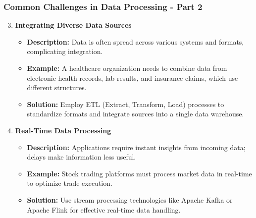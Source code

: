 \documentclass[aspectratio=169]{beamer}
\begin{document}
\begin{frame}[fragile]
    \frametitle{Common Challenges in Data Processing - Part 2}
    \begin{enumerate}
        \setcounter{enumi}{2}
        \item \textbf{Integrating Diverse Data Sources}
        \begin{itemize}
            \item \textbf{Description:} Data is often spread across various systems and formats, complicating integration.
            \item \textbf{Example:} A healthcare organization needs to combine data from electronic health records, lab results, and insurance claims, which use different structures.
            \item \textbf{Solution:} Employ ETL (Extract, Transform, Load) processes to standardize formats and integrate sources into a single data warehouse.
        \end{itemize}
        
        \item \textbf{Real-Time Data Processing}
        \begin{itemize}
            \item \textbf{Description:} Applications require instant insights from incoming data; delays make information less useful.
            \item \textbf{Example:} Stock trading platforms must process market data in real-time to optimize trade execution.
            \item \textbf{Solution:} Use stream processing technologies like Apache Kafka or Apache Flink for effective real-time data handling.
        \end{itemize}
    \end{enumerate}
\end{frame}
\end{document}
